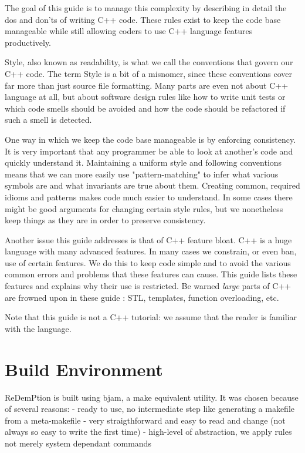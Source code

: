 \documentclass[11pt]{report}
\begin{document}
The goal of this guide is to manage this complexity by describing in detail the dos and don'ts of writing C++ code. These rules exist to keep the code base manageable while still allowing coders to use C++ language features productively.

Style, also known as readability, is what we call the conventions that govern our C++ code. The term Style is a bit of a misnomer, since these conventions cover far more than just source file formatting. Many parts are even not about C++ language at all, but about software design rules like how to write unit tests or which code smells should be avoided and how the code should be refactored if such a smell is detected.

One way in which we keep the code base manageable is by enforcing consistency. It is very important that any programmer be able to look at another's code and quickly understand it. Maintaining a uniform style and following conventions means that we can more easily use "pattern-matching" to infer what various symbols are and what invariants are true about them. Creating common, required idioms and patterns makes code much easier to understand. In some cases there might be good arguments for changing certain style rules, but we nonetheless keep things as they are in order to preserve consistency.

Another issue this guide addresses is that of C++ feature bloat. C++ is a huge language with many advanced features. In many cases we constrain, or even ban, use of certain features. We do this to keep code simple and to avoid the various common errors and problems that these features can cause. This guide lists these features and explains why their use is restricted. Be warned \emph{large} parts of C++ are frowned upon in these guide : STL, templates, function overloading, etc.


Note that this guide is not a C++ tutorial: we assume that the reader is familiar with the language.

\chapter{Build Environment}

ReDemPtion is built using bjam, a make equivalent utility. It was chosen because of several reasons:
- ready to use, no intermediate step like generating a makefile from a meta-makefile
- very straigthforward and easy to read and change (not always so easy to write the first time)
- high-level of abstraction, we apply rules not merely system dependant commands
\end{document}
